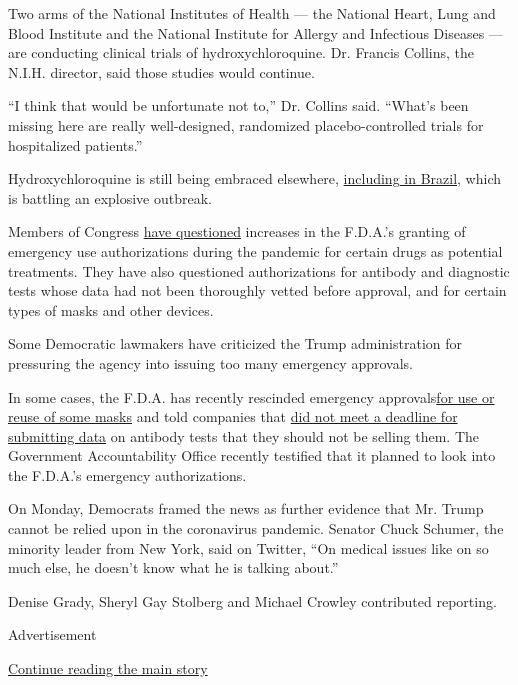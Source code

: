 Two arms of the National Institutes of Health --- the National Heart,
Lung and Blood Institute and the National Institute for Allergy and
Infectious Diseases --- are conducting clinical trials of
hydroxychloroquine. Dr. Francis Collins, the N.I.H. director, said those
studies would continue.

``I think that would be unfortunate not to,'' Dr. Collins said. ``What's
been missing here are really well-designed, randomized
placebo-controlled trials for hospitalized patients.''

Hydroxychloroquine is still being embraced elsewhere,
\href{https://www.nytimes.com/2020/06/13/world/americas/virus-brazil-bolsonaro-chloroquine.html}{including
in Brazil,} which is battling an explosive outbreak.

Members of Congress
\href{https://www.warren.senate.gov/imo/media/doc/2020.05.06\%20Letter\%20to\%20FDA\%20re\%20data\%20tracking.pdf}{have
questioned} increases in the F.D.A.'s granting of emergency use
authorizations during the pandemic for certain drugs as potential
treatments. They have also questioned authorizations for antibody and
diagnostic tests whose data had not been thoroughly vetted before
approval, and for certain types of masks and other devices.

Some Democratic lawmakers have criticized the Trump administration for
pressuring the agency into issuing too many emergency approvals.

In some cases, the F.D.A. has recently rescinded emergency
approvals\href{https://www.nytimes.com/2020/06/07/science/masks-china-coronavirus.html}{for
use or reuse of some masks} and told companies that
\href{https://www.nytimes.com/2020/05/04/health/fda-antibody-tests-coronavirus.html}{did
not meet a deadline for submitting data} on antibody tests that they
should not be selling them. The Government Accountability Office
recently testified that it planned to look into the F.D.A.'s emergency
authorizations.

On Monday, Democrats framed the news as further evidence that Mr. Trump
cannot be relied upon in the coronavirus pandemic. Senator Chuck
Schumer, the minority leader from New York, said on Twitter, ``On
medical issues like on so much else, he doesn't know what he is talking
about.''

Denise Grady, Sheryl Gay Stolberg and Michael Crowley contributed
reporting.

Advertisement

\protect\hyperlink{after-bottom}{Continue reading the main story}

